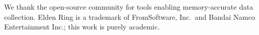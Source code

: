 \documentclass{article}
\theoremstyle{plain}
\theoremstyle{definition}
\theoremstyle{remark}
\newcommand{\methodname}{\textbf{Incantation}\xspace}
\begin{document}







\begin{ack}
We thank the open-source community for tools enabling memory-accurate data collection. Elden Ring is a trademark of FromSoftware, Inc.\ and Bandai Namco Entertainment Inc.; this work is purely academic.
\end{ack}




\appendix


\end{document}
